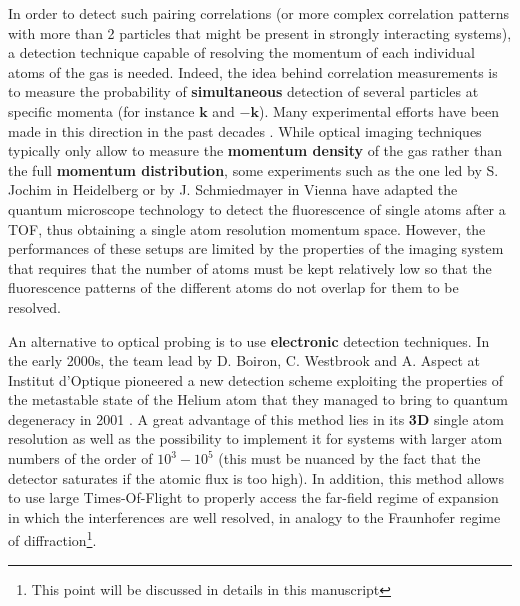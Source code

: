 In order to detect such pairing correlations (or more complex correlation patterns with more than 2 particles that might be present in strongly interacting systems), a detection technique capable of resolving the momentum of each individual atoms of the gas is needed. Indeed, the idea behind correlation measurements is to measure the probability of \textbf{simultaneous} detection of several particles at specific momenta (for instance $\bm{k}$ and $-\bm{k}$). Many experimental efforts have been made in this direction in the past decades \cite{ott2016single}. While optical imaging techniques typically only allow to measure the \textbf{momentum density} of the gas rather than the full \textbf{momentum distribution}, some experiments such as the one led by S. Jochim in Heidelberg \cite{serwane2011deterministic} or by J. Schmiedmayer in Vienna \cite{bucker2009single} have adapted the quantum microscope technology to detect the fluorescence of single atoms after a TOF, thus obtaining a single atom resolution momentum space. However, the performances of these setups are limited by the properties of the imaging system that requires that the number of atoms must be kept relatively low so that the fluorescence patterns of the different atoms do not overlap for them to be resolved.

An alternative to optical probing is to use \textbf{electronic} detection techniques. In the early 2000s, the team lead by D. Boiron, C. Westbrook and A. Aspect at Institut d'Optique pioneered a new detection scheme exploiting the properties of the metastable state of the Helium atom that they managed to bring to quantum degeneracy in 2001 \cite{robert2001bose}. A great advantage of this method lies in its \textbf{3D} single atom resolution as well as the possibility to implement it for systems with larger atom numbers of the order of $10^3-10^5$ (this must be nuanced by the fact that the detector saturates if the atomic flux is too high). In addition, this method allows to use large Times-Of-Flight to properly access the far-field regime of expansion in which the interferences are well resolved, in analogy to the Fraunhofer regime of diffraction\footnote{This point will be discussed in details in this manuscript}.

